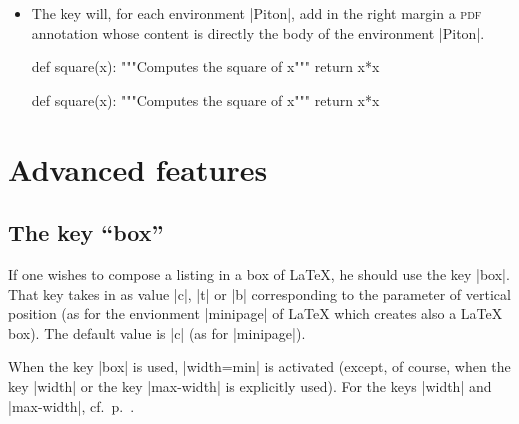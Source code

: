 \documentclass{article}
\begin{document}
\begin{itemize}
\medskip
\begin{Code}
\begin{Piton}[\emph{paperclip},background-color=gray!15]
def square(x):
    """Computes the square of x"""
    return x*x
\end{Piton}    
\end{Code}

\medskip
\begin{Piton}[paperclip,background-color=gray!15]
def square(x):
    """Computes the square of x"""
    return x*x
\end{Piton}    


\item {}
The key  will, for each environment |{Piton}|, add in the right
margin a \textsc{pdf} annotation whose content is directly the body of the
environment |{Piton}|.

\medskip
\begin{Code}
\begin{Piton}[\emph{annotation},background-color=gray!15]
def square(x):
    """Computes the square of x"""
    return x*x
\end{Piton}    
\end{Code}

\medskip
\begin{Piton}[annotation,background-color=gray!15]
def square(x):
    """Computes the square of x"""
    return x*x
\end{Piton}    


\end{itemize}

\section{Advanced features}

\subsection{The key ``box''}

\label{box}

If one wishes to compose a listing in a box of LaTeX, he should use the key
|box|. That key takes in as value |c|, |t| or |b| corresponding to the parameter
of vertical position (as for the envionment |{minipage}| of LaTeX which creates also
a LaTeX box). The default value is |c| (as for |{minipage}|).

When the  key |box| is used, |width=min| is activated (except, of course, when the
key |width| or the key |max-width| is explicitly used). For the keys |width| and
|max-width|, cf.~p.~\pageref{width}.
\end{document}
